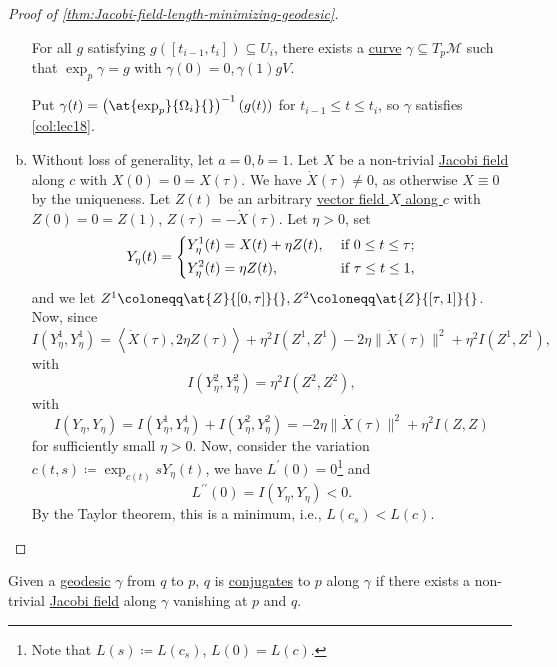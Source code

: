 \begin{proof}[Proof of \autoref{thm:Jacobi-field-length-minimizing-geodesic}]
\begin{enumerate}[(a)]
		      \begin{claim}
			      For all \(g\) satisfying \(g([t_{i-1}, t_i]) \subseteq U_i\), there exists a \hyperref[def:curve]{curve} \(\gamma \subseteq T_p \mathcal{M} \) such that \(\exp _p \gamma = g\) with \(\gamma (0) = 0 , \gamma (1) g V\).
		      \end{claim}
		      \begin{explanation}
			      Put \(\gamma (t) = \left( \at{\exp _p}{\Omega _i}{} \right)^{-1} (g(t)) \) for \(t_{i-1} \leq t \leq t_i\), so \(\gamma \) satisfies \autoref{col:lec18}.
		      \end{explanation}
		\item  Without loss of generality, let \(a = 0, b= 1\). Let \(X\) be a non-trivial \hyperref[def:Jacobi-field]{Jacobi field} along \(c\) with \(X(0) = 0 = X(\tau )\). We have \(\dot{X} (\tau ) \neq 0\), as otherwise \(X \equiv 0\) by the uniqueness. Let \(Z(t)\) be an arbitrary \hyperref[def:vector-field-along-curve]{vector field \(X\) along \(c\)} with \(Z(0) = 0 = Z(1)\), \(Z(\tau ) = - \dot{X} (\tau )\). Let \(\eta > 0\), set
		      \[
			      Y_\eta (t) = \begin{dcases}
				      Y_\eta ^1(t) = X(t) + \eta Z(t), & \text{ if } 0 \leq t \leq \tau ; \\
				      Y_\eta ^2(t) = \eta Z(t),        & \text{ if } \tau \leq t \leq 1 ,
			      \end{dcases}
		      \]
		      and we let \(Z^1 \coloneqq \at{Z}{[0, \tau ]}{} , Z^2 \coloneqq \at{Z}{[\tau , 1]}{} \). Now, since
		      \[
			      I(Y_\eta ^1, Y_\eta ^1)
			      = \left\langle \dot{X} (\tau ), 2 \eta Z(\tau ) \right\rangle + \eta ^2 I(Z^1, Z^1) - 2 \eta \lVert \dot{X}(\tau)\rVert^2 + \eta ^2 I(Z^1, Z^1),
		      \]
		      with
		      \[
			      I(Y_\eta ^2, Y_\eta ^2) = \eta ^2 I(Z^2, Z^2),
		      \]
		      with
		      \[
			      I(Y_\eta , Y_\eta ) = I(Y_\eta ^1, Y_\eta ^1) + I(Y_\eta ^2, Y_\eta ^2) = -2 \eta \lVert \dot{X} (\tau ) \rVert ^2 + \eta ^2 I(Z, Z)
		      \]
		      for sufficiently small \(\eta > 0\). Now, consider the variation \(c(t, s) \coloneqq \exp _{c(t)} s Y_\eta (t)\), we have \(L^{\prime} (0) = 0\)\footnote{Note that \(L(s) \coloneqq L(c_s)\), \(L(0) = L(c)\).} and
		      \[
			      L^{\prime\prime} (0) = I(Y_\eta , Y_\eta ) < 0.
		      \]
		      By the Taylor theorem, this is a minimum, i.e., \(L(c_s) < L(c)\).
	\end{enumerate}
\end{proof}

\begin{remark}
	Given a \hyperref[def:geodesic]{geodesic} \(\gamma \) from \(q\) to \(p\), \(q\) is \hyperref[def:conjugate-locus]{conjugates} to \(p\) along \(\gamma \) if there exists a non-trivial \hyperref[def:Jacobi-field]{Jacobi field} along \(\gamma \) vanishing at \(p\) and \(q\).
\end{remark}

